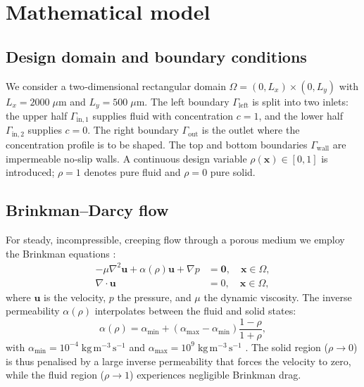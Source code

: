 \documentclass[12pt]{article}
\begin{document}
\section{Mathematical model}
\label{sec:model}

\subsection{Design domain and boundary conditions}
We consider a two‑dimensional rectangular domain $\Omega = (0, L_x) \times (0, L_y)$ with $L_x = 2000\;\mu\text{m}$ and $L_y = 500\;\mu\text{m}$. The left boundary $\Gamma_{\text{left}}$ is split into two inlets: the upper half $\Gamma_{\text{in},1}$ supplies fluid with concentration $c = 1$, and the lower half $\Gamma_{\text{in},2}$ supplies $c = 0$. The right boundary $\Gamma_{\text{out}}$ is the outlet where the concentration profile is to be shaped. The top and bottom boundaries $\Gamma_{\text{wall}}$ are impermeable no‑slip walls. A continuous design variable $\rho(\mathbf{x}) \in [0,1]$ is introduced; $\rho = 1$ denotes pure fluid and $\rho = 0$ pure solid.

\subsection{Brinkman–Darcy flow}
For steady, incompressible, creeping flow through a porous medium we employ the Brinkman equations \cite{borrvall2003, gersborg2005}:
\begin{align}
-\mu \nabla^2 \mathbf{u} + \alpha(\rho) \mathbf{u} + \nabla p &= \mathbf{0}, \quad \mathbf{x} \in \Omega, \label{eq:brinkman}\\
\nabla \cdot \mathbf{u} &= 0, \quad \mathbf{x} \in \Omega, \label{eq:continuity}
\end{align}
where $\mathbf{u}$ is the velocity, $p$ the pressure, and $\mu$ the dynamic viscosity. The inverse permeability $\alpha(\rho)$ interpolates between the fluid and solid states:
\begin{equation}
\alpha(\rho) = \alpha_{\min} + (\alpha_{\max} - \alpha_{\min}) \frac{1 - \rho}{1 + \rho}, \label{eq:alpha}
\end{equation}
with $\alpha_{\min} = 10^{-4}\;\text{kg}\,\text{m}^{-3}\,\text{s}^{-1}$ and $\alpha_{\max} = 10^{9}\;\text{kg}\,\text{m}^{-3}\,\text{s}^{-1}$ \cite{borrvall2003, aage2008}. The solid region ($\rho \to 0$) is thus penalised by a large inverse permeability that forces the velocity to zero, while the fluid region ($\rho \to 1$) experiences negligible Brinkman drag.
\end{document}
